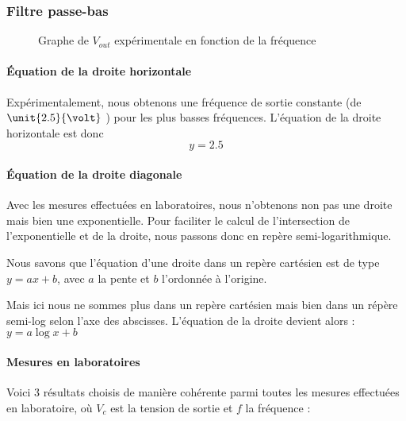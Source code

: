\subsubsection{Filtre passe-bas}

\begin{figure}[ht!]
\centering
{}
\caption{Graphe de $V_{out}$ expérimentale en fonction de la fréquence}
\label{lwp_ratio}
\end{figure}


\paragraph{Équation de la droite horizontale}
Expérimentalement, nous obtenons une fréquence de sortie constante (de $\unit{2.5}{\volt}$ )
pour les plus basses fréquences. L'équation de la droite horizontale est donc \[y=2.5\]

\paragraph{Équation de la droite diagonale}

Avec les mesures effectuées en laboratoires, nous n'obtenons non pas une droite mais bien une exponentielle.
Pour faciliter le calcul de l'intersection de l'exponentielle et de la droite, nous passons donc en repère
semi-logarithmique.

Nous savons que l'équation d'une droite dans un repère cartésien est de type $y=ax+b$, avec $a$ la pente
et $b$ l'ordonnée à l'origine.

Mais ici nous ne sommes plus dans un repère cartésien mais bien dans un répère semi-log selon l'axe des
abscisses. L'équation de la droite devient alors : $y=a\log{x}+b$

\paragraph{Mesures en laboratoires}

Voici 3 résultats choisis de manière cohérente parmi toutes les mesures effectuées en laboratoire, où
$V_c$ est la tension de sortie et $f$ la fréquence :

